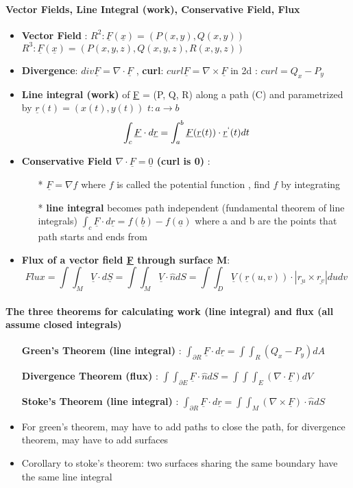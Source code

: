 \documentclass[8pt, twocolumn]{article}
\begin{document}
\paragraph{Vector Fields, Line Integral (work), Conservative Field, Flux}
\begin{itemize}
	\item \textbf{Vector Field} : $R^2 : \underline{F}(\underline{x})  = (P(x, y), Q(x, y))$  $R^3: \underline{F}(\underline{x})  = (P(x, y, z), Q(x, y, z),  R(x, y, z))$
	\item \textbf{Divergence}:  $div\underline{F} = \nabla \cdot \underline{F}$ , \textbf{curl}:  $curl\underline{F} = \nabla \times \underline{F}$ in 2d : $curl = Q_x - P_y$
	\item \textbf{Line integral (work)} of \underline{F} = (P, Q, R) along a path (C) and parametrized by $\underline{r}(t) = (x(t), y(t))$ $t: a \rightarrow b$ 	
	$$\int_c{\underline{F} \cdot d\underline{r}} = \int_a^b{\underline{F}(\underline{r}(t)) \cdot \underline{r}^`(t) dt}$$
	\item \textbf{Conservative Field $\nabla \cdot \underline{F} = \underline{0}$ (curl is 0)} : 
		\begin{itemize}
			\item[*] $\underline{F} = \nabla f$ where $f$ is called the potential function , find $f$ by integrating 
			\item[*] \textbf{line integral} becomes path independent (fundamental theorem of line integrals) $\int_c{\underline{F} \cdot d\underline{r}} = f(\underline{b}) - f(\underline{a})$ where a and b are the points that path starts and ends from
		\end{itemize}
	\item  \textbf{Flux of a vector field \underline{F} through surface \textbf{M}}: $$Flux = \int\int_M{\underline{V} \cdot d\underline{S}} = \int\int_M{\underline{V} \cdot \hat{n} dS} = \int\int_D{\underline{V}(\underline{r}(u, v)) \cdot |\underline{r_u} \times \underline{r_v}| du dv}$$
\end{itemize}

\paragraph{The three theorems for calculating work (line integral) and flux (all assume closed integrals)} 
\begin{itemize}
	\item[] \textbf{Green's Theorem (line integral)} : $\int_{\partial{R}}{\underline{F} \cdot d\underline{r}} = \int\int_R{(Q_x - P_y) dA}$
	\item[] \textbf{Divergence Theorem (flux)} : $\int\int_{\partial{E}}{\underline{F} \cdot \hat{n} dS} = \int\int\int_E{(\nabla \cdot \underline{F}) dV} $
	\item[] \textbf{Stoke's Theorem  (line integral)} : $\int_{\partial{R}}{\underline{F} \cdot d\underline{r}} = \int\int_M{(\nabla \times \underline{F}) \cdot \hat{n} dS}$	

\end{itemize}

\begin{itemize}
	\item For green's theorem, may have to add paths to close the path, for divergence theorem, may have to add surfaces
	\item Corollary to stoke's theorem: two surfaces sharing the same boundary have the same line integral
\end{itemize}
\end{document}
